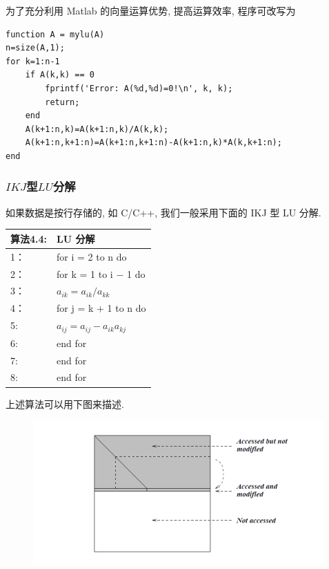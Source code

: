 \documentclass[12pt,a4paper]{article}
\begin{document}
为了充分利用 Matlab 的向量运算优势, 提高运算效率, 程序可改写为
\begin{lstlisting}[language={[ANSI]C}] 
% Matlab code 2 : LU 分解
function A = mylu(A)
n=size(A,1);
for k=1:n-1
	if A(k,k) == 0
		fprintf('Error: A(%d,%d)=0!\n', k, k);
		return;
	end
	A(k+1:n,k)=A(k+1:n,k)/A(k,k);
	A(k+1:n,k+1:n)=A(k+1:n,k+1:n)-A(k+1:n,k)*A(k,k+1:n);
end
\end{lstlisting}


\newpage
\subsubsection{$IKJ$型$LU$分解}
如果数据是按行存储的, 如 C/C++, 我们一般采用下面的 IKJ 型 LU 分解.
\begin{table}  
	\begin{tabular*}{16cm}{ll}  
		\hline  
		算法4.4: & LU 分解 \\  
		\hline  
		1：   &for i = 2 to n do\\  
		2：   &\qquad for k = 1 to i − 1 do\\
		3：   &\qquad \qquad $a_{ik} = a_{ik}/a_{kk}$\\
		4：   &\qquad \qquad for j = k + 1 to n do\\
		5:    &\qquad \qquad \qquad $a_{ij} = a_{ij} − a_{ik}a_{kj}$\\
		6:    &\qquad \qquad end for\\
		7:    &\qquad end for\\
		8:    &end for \\
		\hline  
	\end{tabular*}  
\end{table} 

上述算法可以用下图来描述.

\begin{figure}[h]%
	\centering  %
	\includegraphics[width=0.7\linewidth]{figures/Figure_6.png}  %
	\caption{}  %
	\label{fig:mcmthesis-logo}   %
\end{figure}
\end{document}
